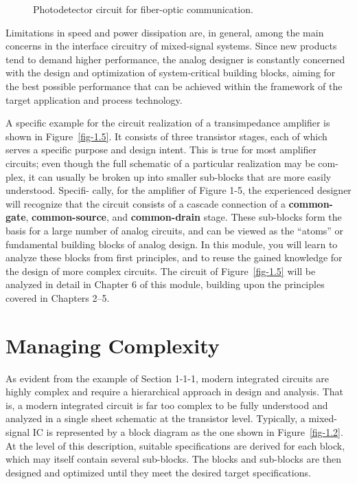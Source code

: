 \documentclass[
  11pt,
  letterpaper,
  abstract]{scrbook}
\begin{document}
\begin{figure}


\caption{\label{fig-1.4}Photodetector circuit for fiber-optic
communication.}

\end{figure}%

Limitations in speed and power dissipation are, in general, among the
main concerns in the interface circuitry of mixed-signal systems. Since
new products tend to demand higher performance, the analog designer is
constantly concerned with the design and optimization of system-critical
building blocks, aiming for the best possible performance that can be
achieved within the framework of the target application and process
technology.

A specific example for the circuit realization of a transimpedance
amplifier is shown in Figure~\ref{fig-1.5}. It consists of three
transistor stages, each of which serves a specific purpose and design
intent. This is true for most amplifier circuits; even though the full
schematic of a particular realization may be com- plex, it can usually
be broken up into smaller sub-blocks that are more easily understood.
Specifi- cally, for the amplifier of Figure 1-5, the experienced
designer will recognize that the circuit consists of a cascade
connection of a \textbf{common-gate}, \textbf{common-source}, and
\textbf{common-drain} stage. These sub-blocks form the basis for a large
number of analog circuits, and can be viewed as the ``atoms'' or
fundamental building blocks of analog design. In this module, you will
learn to analyze these blocks from first principles, and to reuse the
gained knowledge for the design of more complex circuits. The circuit of
Figure~\ref{fig-1.5} will be analyzed in detail in Chapter 6 of this
module, building upon the principles covered in Chapters 2--5.

\section{Managing Complexity}\label{managing-complexity}

As evident from the example of Section 1-1-1, modern integrated circuits
are highly complex and require a hierarchical approach in design and
analysis. That is, a modern integrated circuit is far too complex to be
fully understood and analyzed in a single sheet schematic at the
transistor level. Typically, a mixed-signal IC is represented by a block
diagram as the one shown in Figure~\ref{fig-1.2}. At the level of this
description, suitable specifications are derived for each block, which
may itself contain several sub-blocks. The blocks and sub-blocks are
then designed and optimized until they meet the desired target
specifications.
\end{document}
